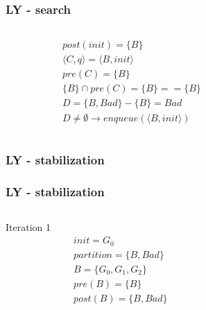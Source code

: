 \documentclass[11pt,handout]{beamer}
\begin{document}
\begin{frame}[fragile]
  \frametitle{LY - search}
  \begin{columns}
    \begin{column}{0.5\textwidth}
      \begin{align*}
        & post(init) = \{B\} \\
        & \langle {C,q} \rangle = \langle {B,init} \rangle \\
        & pre(C) = \{ B \} \\
        & \{B\} \cap pre(C) = \{B\} == \{B\} \\
        & D = \{B,Bad\} - \{B\} = Bad \\
        & D \neq \emptyset \to enqueue(\langle {B,init} \rangle)
      \end{align*}
    \end{column}
    \begin{column}{0.5\textwidth}%
      
    \end{column}
  \end{columns}
\end{frame}

\begin{frame}[fragile]
  \frametitle{LY - stabilization}
  \begin{algorithmic}[1]
    \EndIf
    \EndWhile
  \end{algorithmic}
\end{frame}

\begin{frame}[fragile]
  \frametitle{LY - stabilization}
  \begin{columns}
    \begin{column}{0.5\textwidth}
      Iteration 1
      \begin{align*}
        & init = G_0 \\
        & partition = \{B,Bad\} \\
        & B = \{G_0,G_1,G_2\} \\
        & pre(B) = \{B\} \\
        & post(B) = \{B,Bad\}
      \end{align*}
    \end{column}
    \begin{column}{0.5\textwidth}%
      
    \end{column}
  \end{columns}
\end{frame}
\end{document}
